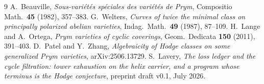 \documentclass[11pt]{article}
\begin{document}
\begin{thebibliography}{9}
 A.~Beauville, \emph{Sous-vari\'et\'es sp\'eciales des
vari\'et\'es de Prym}, Compositio Math.\ \textbf{45} (1982), 357--383.
 G.~Welters, \emph{Curves of twice the minimal class on
principally polarized abelian varieties}, Indag.\ Math.\ \textbf{49} (1987),
87--109.
 H.~Lange and A.~Ortega, \emph{Prym varieties of cyclic
coverings}, Geom.\ Dedicata \textbf{150} (2011), 391--403.
 D.~Patel and Y.~Zhang, \emph{Algebraicity of Hodge classes on
some generalized Prym varieties}, arXiv:2506.13729.
 S.~Lavery, \emph{The loss ledger and the cycle
filtration: tower exhaustion on the helix carrier, and a program whose
terminus is the Hodge conjecture}, preprint draft v0.1, July 2026.
\end{thebibliography}
\end{document}
